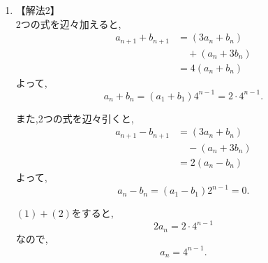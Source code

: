\begin{enumerate}[label=(\arabic*),parsep=3pt]
\begin{enumerate}
                  2式を辺々加えると,
                  \[
                    2a_n=2\cdot4^{n-1}
                  \]
                  であるから,
                  \[
                    a_n=4^{n-1}.
                  \]
                  また,
                  \[
                    b_n=a_n=4^{n-1}.
                  \]
            \item 【解法2】\\
                  2つの式を辺々加えると,
                  \begin{align*}
                    a_{n+1}+b_{n+1}
                      &=(3a_n+b_n)\\
                      &\quad +(a_n+3b_n)\\
                      &=4(a_n+b_n)
                  \end{align*}
                  よって,
                  \[
                    a_n+b_n=(a_1+b_1)4^{n-1}=2\cdot4^{n-1}. \tag*{\(\cdots\) (1)}
                  \]

                  また,2つの式を辺々引くと,
                  \begin{align*}
                    a_{n+1}-b_{n+1}
                      &=(3a_n+b_n)\\
                      &\quad -(a_n+3b_n)\\
                      &=2(a_n-b_n)
                  \end{align*}
                  よって,
                  \[
                    a_n-b_n=(a_1-b_1)2^{n-1}=0. \tag*{\(\cdots\) (2)}
                  \]

                  \((1)+(2)\)をすると,
                  \[
                    2a_n=2\cdot4^{n-1}
                  \]
                  なので,
                  \[
                    a_n=4^{n-1}.
                  \]


\end{enumerate}
\end{enumerate}
